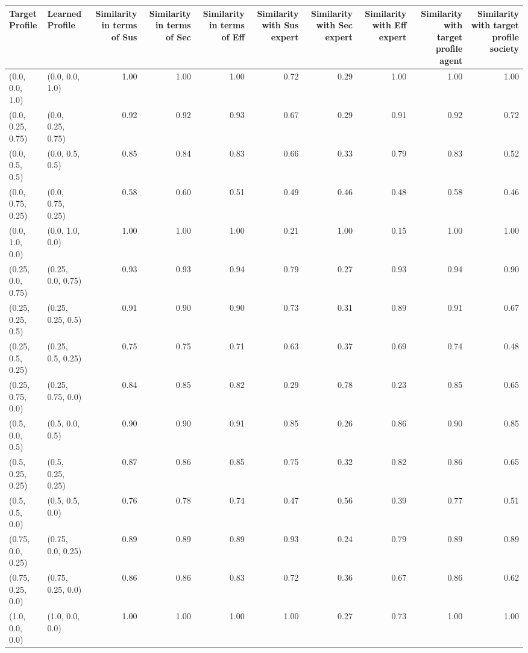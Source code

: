 \begin{tabular}{llrrrrrrrr}
\toprule
Target Profile & Learned Profile & Similarity in terms of Sus & Similarity in terms of Sec & Similarity in terms of Eff & Similarity with Sus expert & Similarity with Sec expert & Similarity with Eff expert & Similarity with target profile agent & Similarity with target profile society \\
\midrule
(0.0, 0.0, 1.0) & (0.0, 0.0, 1.0) & 1.00 & 1.00 & 1.00 & 0.72 & 0.29 & 1.00 & 1.00 & 1.00 \\
(0.0, 0.25, 0.75) & (0.0, 0.25, 0.75) & 0.92 & 0.92 & 0.93 & 0.67 & 0.29 & 0.91 & 0.92 & 0.72 \\
(0.0, 0.5, 0.5) & (0.0, 0.5, 0.5) & 0.85 & 0.84 & 0.83 & 0.66 & 0.33 & 0.79 & 0.83 & 0.52 \\
(0.0, 0.75, 0.25) & (0.0, 0.75, 0.25) & 0.58 & 0.60 & 0.51 & 0.49 & 0.46 & 0.48 & 0.58 & 0.46 \\
(0.0, 1.0, 0.0) & (0.0, 1.0, 0.0) & 1.00 & 1.00 & 1.00 & 0.21 & 1.00 & 0.15 & 1.00 & 1.00 \\
(0.25, 0.0, 0.75) & (0.25, 0.0, 0.75) & 0.93 & 0.93 & 0.94 & 0.79 & 0.27 & 0.93 & 0.94 & 0.90 \\
(0.25, 0.25, 0.5) & (0.25, 0.25, 0.5) & 0.91 & 0.90 & 0.90 & 0.73 & 0.31 & 0.89 & 0.91 & 0.67 \\
(0.25, 0.5, 0.25) & (0.25, 0.5, 0.25) & 0.75 & 0.75 & 0.71 & 0.63 & 0.37 & 0.69 & 0.74 & 0.48 \\
(0.25, 0.75, 0.0) & (0.25, 0.75, 0.0) & 0.84 & 0.85 & 0.82 & 0.29 & 0.78 & 0.23 & 0.85 & 0.65 \\
(0.5, 0.0, 0.5) & (0.5, 0.0, 0.5) & 0.90 & 0.90 & 0.91 & 0.85 & 0.26 & 0.86 & 0.90 & 0.85 \\
(0.5, 0.25, 0.25) & (0.5, 0.25, 0.25) & 0.87 & 0.86 & 0.85 & 0.75 & 0.32 & 0.82 & 0.86 & 0.65 \\
(0.5, 0.5, 0.0) & (0.5, 0.5, 0.0) & 0.76 & 0.78 & 0.74 & 0.47 & 0.56 & 0.39 & 0.77 & 0.51 \\
(0.75, 0.0, 0.25) & (0.75, 0.0, 0.25) & 0.89 & 0.89 & 0.89 & 0.93 & 0.24 & 0.79 & 0.89 & 0.89 \\
(0.75, 0.25, 0.0) & (0.75, 0.25, 0.0) & 0.86 & 0.86 & 0.83 & 0.72 & 0.36 & 0.67 & 0.86 & 0.62 \\
(1.0, 0.0, 0.0) & (1.0, 0.0, 0.0) & 1.00 & 1.00 & 1.00 & 1.00 & 0.27 & 0.73 & 1.00 & 1.00 \\
\bottomrule
\end{tabular}
